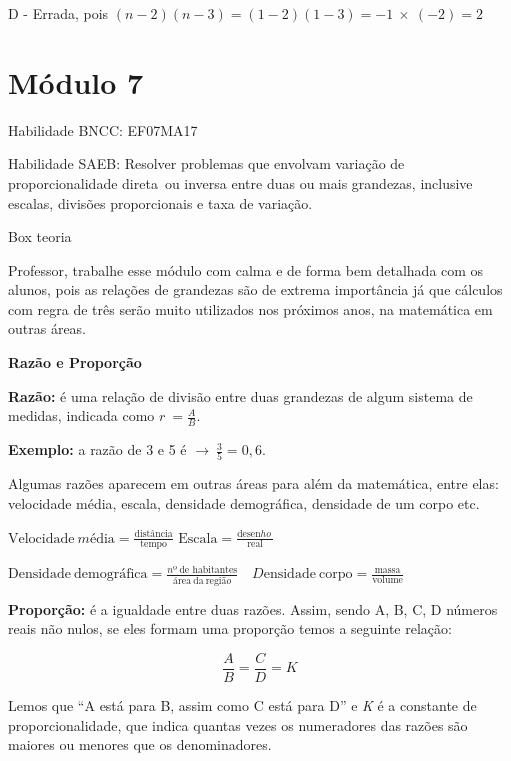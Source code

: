 D - Errada, pois
\(\left( n - 2 \right)\left( n - 3 \right) = \left( 1 - 2 \right)\left( 1 - 3 \right) = - 1\  \times \ ( - 2) = 2\)

\hypertarget{muxf3dulo-7}{%
\section{Módulo 7}\label{muxf3dulo-7}}

Habilidade BNCC: EF07MA17

Habilidade SAEB: Resolver problemas que envolvam variação de
proporcionalidade direta~ou inversa entre duas ou mais grandezas,
inclusive escalas, divisões proporcionais e taxa de variação.

Box teoria

Professor, trabalhe esse módulo com calma e de forma bem detalhada com
os alunos, pois as relações de grandezas são de extrema importância já
que cálculos com regra de três serão muito utilizados nos próximos anos,
na matemática em outras áreas.

\textbf{Razão e Proporção}

\textbf{{Razão:}} é uma relação de divisão entre duas grandezas de algum
sistema de medidas, indicada como \(r\  = \frac{A}{B}\).

\textbf{Exemplo:} a razão de 3 e 5 é
\(\rightarrow \ \frac{3}{5} = 0,6.\)

Algumas razões aparecem em outras áreas para além da matemática, entre
elas: velocidade média, escala, densidade demográfica, densidade de um
corpo etc.

\(\text{Vel}\text{ocidade}\ mé\text{dia} = \frac{\text{dist}â\text{ncia}}{\text{tempo}}\)
\(\text{Escala} = \frac{\text{desen}ho\ }{\text{real}}\ \)

\(\text{Densidade}\ \text{demogr}á\text{fica} = \frac{nº\ \text{de}\text{\ h}\text{abitantes}}{á\text{rea}\ \text{da}\ \text{regi}ão}\)
\(\text{\ \ \ \ \ \ \ \ \ \ \ \ \ \ \ \ \ \ \ \ \ \ \ \ \ }D\text{ensidade}\ \text{corpo} = \frac{\text{massa}}{\text{volume}}\)

\textbf{{Proporção:}} é a igualdade entre duas razões. Assim, sendo A,
B, C, D números reais não nulos, se eles formam uma proporção temos a
seguinte relação:

\[\frac{A}{B} = \frac{C}{D} = K\]

Lemos que ``A está para B, assim como C está para D'' e \emph{K} é a
constante de proporcionalidade, que indica quantas vezes os numeradores
das razões são maiores ou menores que os denominadores.

